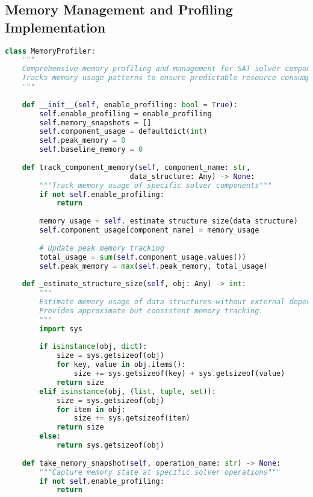 \subsection{Memory Management and Profiling Implementation}
\label{appendix:memory-management}

\begin{lstlisting}[language=Python, caption=Memory Management and Profiling System]
class MemoryProfiler:
    """
    Comprehensive memory profiling and management for SAT solver components.
    Tracks memory usage patterns to ensure predictable resource consumption.
    """
    
    def __init__(self, enable_profiling: bool = True):
        self.enable_profiling = enable_profiling
        self.memory_snapshots = []
        self.component_usage = defaultdict(int)
        self.peak_memory = 0
        self.baseline_memory = 0
    
    def track_component_memory(self, component_name: str, 
                             data_structure: Any) -> None:
        """Track memory usage of specific solver components"""
        if not self.enable_profiling:
            return
        
        memory_usage = self._estimate_structure_size(data_structure)
        self.component_usage[component_name] = memory_usage
        
        # Update peak memory tracking
        total_usage = sum(self.component_usage.values())
        self.peak_memory = max(self.peak_memory, total_usage)
    
    def _estimate_structure_size(self, obj: Any) -> int:
        """
        Estimate memory usage of data structures without external dependencies.
        Provides approximate but consistent memory tracking.
        """
        import sys
        
        if isinstance(obj, dict):
            size = sys.getsizeof(obj)
            for key, value in obj.items():
                size += sys.getsizeof(key) + sys.getsizeof(value)
            return size
        elif isinstance(obj, (list, tuple, set)):
            size = sys.getsizeof(obj)
            for item in obj:
                size += sys.getsizeof(item)
            return size
        else:
            return sys.getsizeof(obj)
    
    def take_memory_snapshot(self, operation_name: str) -> None:
        """Capture memory state at specific solver operations"""
        if not self.enable_profiling:
            return
        

\end{lstlisting}
